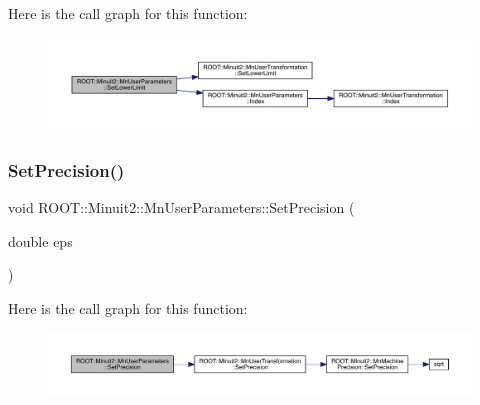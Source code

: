 Here is the call graph for this function\+:\nopagebreak
\begin{figure}[H]
\begin{center}
\leavevmode
\includegraphics[width=350pt]{d6/d10/classROOT_1_1Minuit2_1_1MnUserParameters_a3423d925b9a4b455c6130fa19f66adb4_cgraph}
\end{center}
\end{figure}
\mbox{\label{classROOT_1_1Minuit2_1_1MnUserParameters_aceaa10ac8b2c83261c3cc026705ee6e0}} 
\subsubsection{\texorpdfstring{SetPrecision()}{SetPrecision()}\hspace{0.1cm}{\footnotesize\ttfamily [1/2]}}
{\footnotesize\ttfamily void R\+O\+O\+T\+::\+Minuit2\+::\+Mn\+User\+Parameters\+::\+Set\+Precision (\begin{DoxyParamCaption}\item[{double}]{eps }\end{DoxyParamCaption})\hspace{0.3cm}{\ttfamily [inline]}}

Here is the call graph for this function\+:
\nopagebreak
\begin{figure}[H]
\begin{center}
\leavevmode
\includegraphics[width=350pt]{d6/d10/classROOT_1_1Minuit2_1_1MnUserParameters_aceaa10ac8b2c83261c3cc026705ee6e0_cgraph}
\end{center}
\end{figure}
\mbox{\label{classROOT_1_1Minuit2_1_1MnUserParameters_aceaa10ac8b2c83261c3cc026705ee6e0}} 
